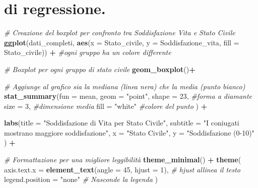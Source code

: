 \documentclass[
]{article}
\newenvironment{Shaded}{\begin{snugshade}}{\end{snugshade}}
\newcommand{\AttributeTok}[1]{\textcolor[rgb]{0.13,0.29,0.53}{#1}}
\newcommand{\CommentTok}[1]{\textcolor[rgb]{0.56,0.35,0.01}{\textit{#1}}}
\newcommand{\DecValTok}[1]{\textcolor[rgb]{0.00,0.00,0.81}{#1}}
\newcommand{\FunctionTok}[1]{\textcolor[rgb]{0.13,0.29,0.53}{\textbf{#1}}}
\newcommand{\NormalTok}[1]{#1}
\newcommand{\SpecialCharTok}[1]{\textcolor[rgb]{0.81,0.36,0.00}{\textbf{#1}}}
\newcommand{\StringTok}[1]{\textcolor[rgb]{0.31,0.60,0.02}{#1}}
\begin{document}
\section{di regressione.}\label{di-regressione.}

\begin{Shaded}
\begin{Highlighting}[]
\CommentTok{\# Creazione del boxplot per confronto tra Soddisfazione Vita e Stato Civile }
\FunctionTok{ggplot}\NormalTok{(dati\_completi, }\FunctionTok{aes}\NormalTok{(}\AttributeTok{x =}\NormalTok{ Stato\_civile, }
                          \AttributeTok{y =}\NormalTok{ Soddisfazione\_vita, }
                          \AttributeTok{fill =}\NormalTok{ Stato\_civile)) }\SpecialCharTok{+} \CommentTok{\#ogni gruppo ha un colore differente}
  
  
  \CommentTok{\# Boxplot per ogni gruppo di stato civile}
  \FunctionTok{geom\_boxplot}\NormalTok{()}\SpecialCharTok{+}
  
  
  \CommentTok{\# Aggiunge al grafico sia la mediana (linea nera) che la media (punto bianco)}
  \FunctionTok{stat\_summary}\NormalTok{(}\AttributeTok{fun =}\NormalTok{ mean, }
               \AttributeTok{geom =} \StringTok{"point"}\NormalTok{, }
               \AttributeTok{shape =} \DecValTok{23}\NormalTok{, }\CommentTok{\#forma a diamante}
               \AttributeTok{size =} \DecValTok{3}\NormalTok{, }\CommentTok{\#dimensione media}
               \AttributeTok{fill =} \StringTok{"white"} \CommentTok{\#colore del punto}
\NormalTok{               ) }\SpecialCharTok{+} 
  
  \FunctionTok{labs}\NormalTok{(}\AttributeTok{title =} \StringTok{"Soddisfazione di Vita per Stato Civile"}\NormalTok{,}
       \AttributeTok{subtitle =} \StringTok{"I coniugati mostrano maggiore soddisfazione"}\NormalTok{,}
       \AttributeTok{x =} \StringTok{"Stato Civile"}\NormalTok{, }
       \AttributeTok{y =} \StringTok{"Soddisfazione (0{-}10)"}
\NormalTok{       ) }\SpecialCharTok{+}
  
  \CommentTok{\# Formattazione per una migliore leggibilità}
  \FunctionTok{theme\_minimal}\NormalTok{() }\SpecialCharTok{+}
  \FunctionTok{theme}\NormalTok{(}
    \AttributeTok{axis.text.x =} \FunctionTok{element\_text}\NormalTok{(}\AttributeTok{angle =} \DecValTok{45}\NormalTok{, }\AttributeTok{hjust =} \DecValTok{1}\NormalTok{), }\CommentTok{\# hjust allinea il testo }
        \AttributeTok{legend.position =} \StringTok{"none"} \CommentTok{\# Nasconde la legenda}
\NormalTok{    )}
\end{Highlighting}
\end{Shaded}
\end{document}
